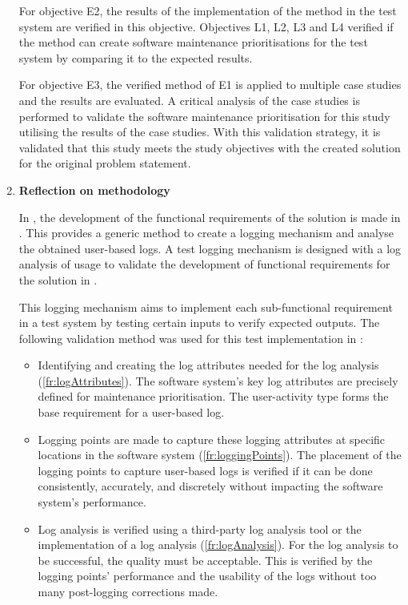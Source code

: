 \begin{enumerate}[label=\textbf{\Roman*.}]
	For objective E2, the results of the implementation of the method in the test system are verified in this objective. Objectives L1, L2, L3 and L4 verified if the method can create software maintenance prioritisations for the test system by comparing it to the expected results. \par For objective E3, the verified method of E1 is applied to multiple case studies and the results are evaluated. A critical analysis of the case studies is performed to validate the software maintenance prioritisation for this study utilising the results of the case studies. With this validation strategy, it is validated that this study meets the study objectives with the created solution for the original problem statement.

\item \textbf{Reflection on methodology} \par In , the development of the functional requirements of the solution is made in . This provides a generic method to create a logging mechanism and analyse the obtained user-based logs. A test logging mechanism is designed with a log analysis of usage to validate the development of functional requirements for the solution in . \par This logging mechanism aims to implement each sub-functional requirement in a test system by testing certain inputs to verify expected outputs. The following validation method was used for this test implementation in :
	\begin{itemize}
		\item Identifying and creating the log attributes needed for the log analysis (\ref{fr:logAttributes}). The software system's key log attributes are precisely defined for maintenance prioritisation. The user-activity type forms the base requirement for a user-based log.
		
		\item Logging points are made to capture these logging attributes at specific locations in the software system (\ref{fr:loggingPoints}). The placement of the logging points to capture user-based logs is verified if it can be done consistently, accurately, and discretely without impacting the software system's performance. 
		
		\item Log analysis is verified using a third-party log analysis tool or the implementation of a log analysis (\ref{fr:logAnalysis}). For the log analysis to be successful, the quality must be acceptable. This is verified by the logging points' performance and the usability of the logs without too many post-logging corrections made.
		

\end{itemize}
\end{enumerate}
